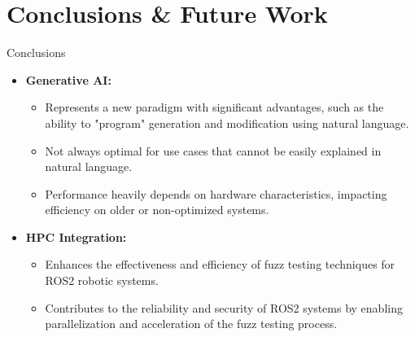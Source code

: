 \documentclass[aspectratio=169]{beamer}
\begin{document}
\section{Conclusions \& Future Work}
\begin{frame}{Conclusions}
\begin{itemize}
    \item \textbf{Generative AI:}
    \begin{itemize}
        \item Represents a new paradigm with significant advantages, such as the ability to "program" generation and modification using natural language.
        \item Not always optimal for use cases that cannot be easily explained in natural language.
        \item Performance heavily depends on hardware characteristics, impacting efficiency on older or non-optimized systems.
    \end{itemize}
    \item \textbf{HPC Integration:}
    \begin{itemize}
        \item Enhances the effectiveness and efficiency of fuzz testing techniques for ROS2 robotic systems.
        \item Contributes to the reliability and security of ROS2 systems by enabling parallelization and acceleration of the fuzz testing process.
    \end{itemize}
\end{itemize}
\end{frame}
\end{document}
